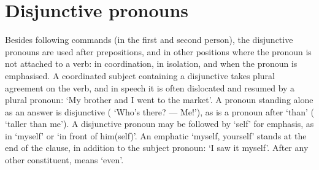 \section{Disjunctive pronouns}\label{sec:disjunctive}
Besides following commands (in the first and second person), the disjunctive pronouns are used after prepositions, and in other positions where the pronoun is not attached to a verb: in coordination, in isolation, and when the pronoun is emphasised. A coordinated subject containing a disjunctive takes plural agreement on the verb, and in speech it is often dislocated and resumed by a plural pronoun:  `My brother and I went to the market'. A pronoun standing alone as an answer is disjunctive ( `Who's there? --- Me!'), as is a pronoun after  `than' ( `taller than me').
A disjunctive pronoun may be followed by  `self' for emphasis, as in  `myself' or  `in front of him(self)'. An emphatic `myself, yourself' stands at the end of the clause, in addition to the subject pronoun:  `I saw it myself'. After any other constituent,  means `even'.

